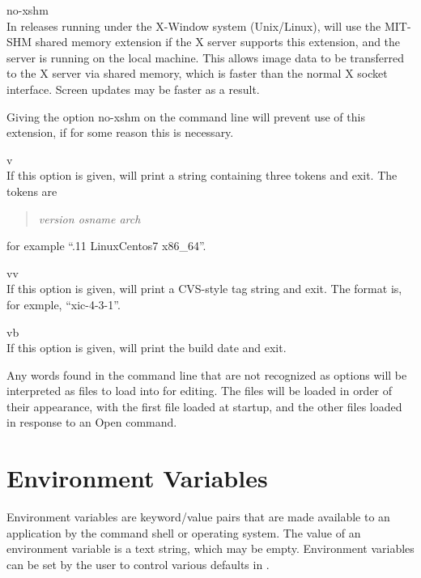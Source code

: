 \begin{description}
\item{\et {}no-xshm}\\
In releases running under the X-Window system (Unix/Linux), {\Xic}
will use the MIT-SHM shared memory extension if the X server supports
this extension, and the server is running on the local machine.  This
allows image data to be transferred to the X server via shared memory,
which is faster than the normal X socket interface.  Screen updates
may be faster as a result.

Giving the option {\et {}no-xshm} on the command
line will prevent use of this extension, if for some reason this is
necessary.

\item{\et {}v}\\
If this option is given, {\Xic} will print a string containing three
tokens and exit.  The tokens are
\begin{quote}
{\it version osname arch}       
\end{quote}
for example ``{.11 LinuxCentos7 x86\_64}''.

\item{\et {}vv}\\
If this option is given, {\Xic} will print a CVS-style tag string and
exit.  The format is, for exmple, ``{\vt xic-4-3-1}''.

\item{\et {}vb}\\
If this option is given, {\Xic} will print the build date and exit. 
\end{description}

Any words found in the command line that are not recognized as options
will be interpreted as files to load into {\Xic} for editing.  The
files will be loaded in order of their appearance, with the first file
loaded at startup, and the other files loaded in response to an {\cb
Open} command.


\section{{\Xic} Environment Variables}
\label{xicenv}
Environment variables are keyword/value pairs that are made available
to an application by the command shell or operating system.  The value
of an environment variable is a text string, which may be empty. 
Environment variables can be set by the user to control various
defaults in {\Xic}.


